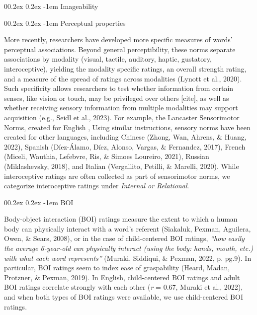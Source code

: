 \documentclass[
  man,floatsintext]{apa6}
\makeatletter
\let\oldparagraph\paragraph
\renewcommand{\paragraph}{
    \@ifstar
      \xxxParagraphStar
      \xxxParagraphNoStar
  }
\newcommand{\xxxParagraphStar}[1]{\oldparagraph*{#1}\mbox{}}
\newcommand{\xxxParagraphNoStar}[1]{\oldparagraph{#1}\mbox{}}
\renewcommand{\paragraph}{\@startsection{paragraph}{4}{\parindent}%
  {0\baselineskip \@plus 0.2ex \@minus 0.2ex}%
  {-1em}%
  {\normalfont\normalsize\bfseries\itshape\typesectitle}}
\makeatother
\begin{document}
\paragraph{Imageability}\label{imageability}

\paragraph{Perceptual properties}\label{perceptual-properties}

More recently, researchers have developed more specific measures of words' perceptual associations. Beyond general perceptibility, these norms separate associations by modality (visual, tactile, auditory, haptic, gustatory, interoceptive), yielding the modality specific ratings, an overall strength rating, and a measure of the spread of ratings across modalities (Lynott et al., 2020). Such specificity allows researchers to test whether information from certain senses, like vision or touch, may be privileged over others {[}cite{]}, as well as whether receiving sensory information from multiple modalities may support acquisition (e.g., Seidl et al., 2023). For example, the Lancaster Sensorimotor Norms, created for English , Using similar instructions, sensory norms have been created for other languages, including Chinese (Zhong, Wan, Ahrens, \& Huang, 2022), Spanish (Díez-Álamo, Díez, Alonso, Vargas, \& Fernandez, 2017), French (Miceli, Wauthia, Lefebvre, Ris, \& Simoes Loureiro, 2021), Russian (Miklashevsky, 2018), and Italian (Vergallito, Petilli, \& Marelli, 2020). While interoceptive ratings are often collected as part of sensorimotor norms, we categorize interoceptive ratings under \emph{Internal or Relational}.

\paragraph{BOI}\label{boi}

Body-object interaction (BOI) ratings measure the extent to which a human body can physically interact with a word's referent (Siakaluk, Pexman, Aguilera, Owen, \& Sears, 2008), or in the case of child-centered BOI ratings, \emph{``how easily the average 6-year-old can physically interact (using the body: hands, mouth, etc.) with what each word represents''} (Muraki, Siddiqui, \& Pexman, 2022, p. pg.9). In particular, BOI ratings seem to index ease of graspability (Heard, Madan, Protzner, \& Pexman, 2019). In English, child-centered BOI ratings and adult BOI ratings correlate strongly with each other (\emph{r} = 0.67, Muraki et al., 2022), and when both types of BOI ratings were available, we use child-centered BOI ratings.
\end{document}
